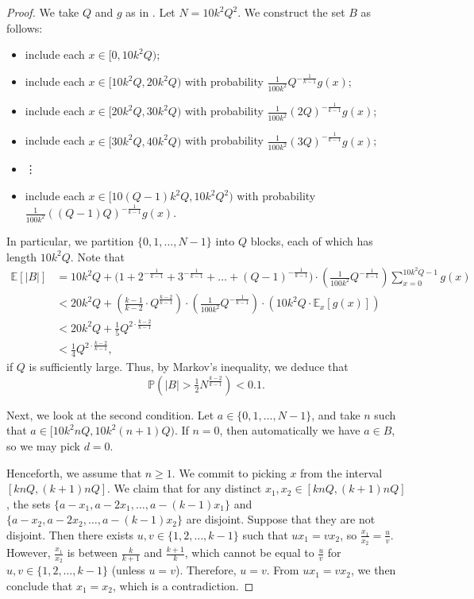 \documentclass[10pt,a4paper]{amsart}
\begin{document}
\begin{proof}
We take $Q$ and $g$ as in .
Let $N=10k^2Q^2$. 
We construct the set $B$ as follows:
\begin{itemize}
    \item include each $x\in [0,10k^2Q)$;
    \item include each $x\in [10k^2Q, 20k^2Q)$ 
    with probability $\frac 1{100k^2} Q^{-\frac 1{k-1}}g(x)$;
    \item include each $x\in [20k^2Q, 30k^2Q)$
    with probability $\frac 1{100k^2} (2Q)^{-\frac 1{k-1}} g(x)$;
    \item include each $x\in [30k^2Q, 40k^2Q)$
    with probability $\frac 1{100k^2} (3Q)^{-\frac 1{k-1}} g(x)$;
    \item \hspace{2cm} \vdots 
    \item include each $x\in [10(Q-1)k^2Q, 10k^2Q^2)$
    with probability $\frac 1{100k^2} ((Q-1)Q)^{-\frac 1{k-1}} g(x)$.
\end{itemize}
In particular, we partition $\{0,1,\dots,N-1\}$ 
into $Q$ blocks, each of which has length $10k^2Q$.
Note that 
\begin{align*}
\mathbb E[|B|] &= 10k^2Q + 
\Big(1+2^{-\frac 1{k-1}}+3^{-\frac 1{k-1}} + \dots + (Q-1)^{-\frac 1{k-1}}\Big)
\cdot \left(\frac 1{100k^2}Q^{-\frac 1{k-1}}\right) \sum_{x=0}^{10k^2Q-1} g(x)\\
&< 20k^2Q  + \left(\frac{k-1}{k-2}\cdot  Q^{\frac{k-2}{k-1}}\right)
\cdot \left(\frac 1{100k^2}  Q^{-\frac 1{k-1}}\right) \cdot 
\left(10k^2Q \cdot \mathbb E_x[g(x)]\right) \\
&< 20k^2 Q + \frac 15 Q^{2\cdot \frac{k-2}{k-1}} \\
&< \frac 14 Q^{2\cdot \frac{k-2}{k-1}},
\end{align*}
if $Q$ is sufficiently large.
Thus, by Markov's inequality, we deduce that 
$$\mathbb P\left(|B| > \tfrac 12 N^{\frac{k-2}{k-1}}\right) < 0.1.$$

Next, we look at the second condition.
Let $a\in\{0,1,\dots,N-1\}$, and take $n$ such that
$a\in [10k^2nQ, 10k^2(n+1)Q)$.
If $n=0$, then automatically we have $a\in B$,
so we may pick $d=0$.

Henceforth, we assume that $n\geq 1$.
We commit to picking $x$ from the interval $[knQ, (k+1)nQ]$. 
We claim that for any distinct $x_1, x_2\in [knQ, (k+1)nQ]$,
the sets $\{a-x_1, a-2x_1,\dots,a-(k-1)x_1\}$
and $\{a-x_2,a-2x_2,\dots,a-(k-1)x_2\}$ are disjoint.
Suppose that they are not disjoint. Then there exists 
$u,v\in\{1,2,\dots,k-1\}$ such that 
$ux_1 = vx_2$, so $\tfrac{x_1}{x_2} = \tfrac uv$.
However, $\tfrac{x_1}{x_2}$ is between $\tfrac k{k+1}$
and $\tfrac{k+1}k$, which cannot be equal to 
$\tfrac uv$ for $u,v\in\{1,2,\dots,k-1\}$
(unless $u=v$).
Therefore, $u=v$. From $ux_1=vx_2$, we then conclude that 
$x_1=x_2$, which is a contradiction.


\end{proof}
\end{document}
